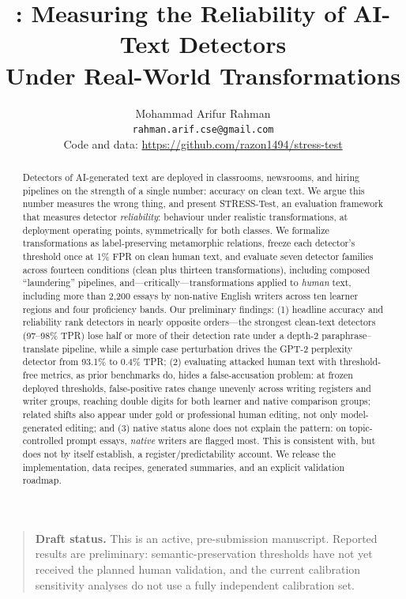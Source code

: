 \documentclass[11pt]{article}
\title{\stresstest: Measuring the Reliability of AI-Text Detectors\\
Under Real-World Transformations}
\author{Mohammad Arifur Rahman\\
\texttt{rahman.arif.cse@gmail.com}\\
\small Code and data: \url{https://github.com/razon1494/stress-test}}
\date{}
\newcommand{\stresstest}{STRESS-Test}
\begin{document}
\maketitle

\begin{quote}
\small\textbf{Draft status.} This is an active, pre-submission manuscript.
Reported results are preliminary: semantic-preservation thresholds have not yet
received the planned human validation, and the current calibration sensitivity
analyses do not use a fully independent calibration set.
\end{quote}

\begin{abstract}
Detectors of AI-generated text are deployed in classrooms, newsrooms, and hiring
pipelines on the strength of a single number: accuracy on clean text. We argue
this number measures the wrong thing, and present \stresstest, an evaluation
framework that measures detector \emph{reliability}: behaviour under realistic
transformations, at deployment operating points, symmetrically for both classes.
We formalize transformations as label-preserving metamorphic relations, freeze
each detector's threshold once at 1\% FPR on clean human text, and evaluate
seven detector families across fourteen conditions (clean plus thirteen
transformations), including composed
``laundering'' pipelines, and---critically---transformations applied to
\emph{human} text, including more than 2{,}200 essays by non-native English
writers across ten learner regions and four proficiency bands. Our preliminary
findings: (1) headline
accuracy and reliability rank detectors in nearly opposite orders---the
strongest clean-text detectors (97--98\% TPR) lose half or more of their
detection rate under a depth-2 paraphrase--translate pipeline, while a simple
case perturbation drives the GPT-2 perplexity detector from 93.1\% to 0.4\%
TPR; (2) evaluating attacked human text with threshold-free metrics,
as prior benchmarks do, hides a false-accusation problem: at frozen deployed
thresholds, false-positive rates change unevenly across writing registers and
writer groups, reaching double digits for both learner and native comparison
groups; related shifts also appear under gold or professional human editing,
not only model-generated editing; and (3) native status alone does not explain
the pattern: on topic-controlled prompt essays, \emph{native} writers are
flagged most. This is consistent with, but does not by itself establish, a
register/predictability account. We release the implementation, data recipes,
generated summaries, and an explicit validation roadmap.
\end{abstract}
\end{document}
